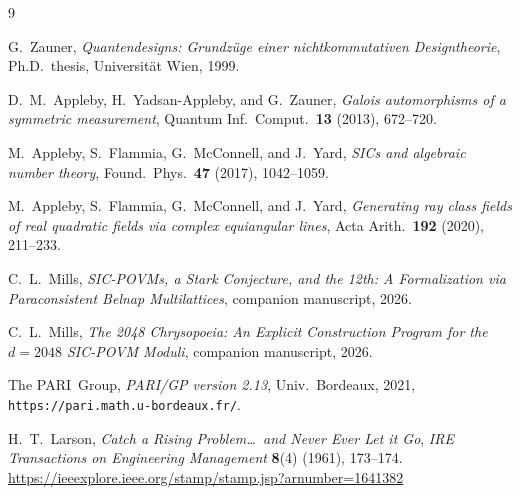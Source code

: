 \documentclass[12pt,a4paper]{article}
\begin{document}
\begin{thebibliography}{9}

G.\ Zauner, \emph{Quantendesigns: Grundz\"uge einer nichtkommutativen Designtheorie}, Ph.D.\ thesis, Universit\"at Wien, 1999.

D.\ M.\ Appleby, H.\ Yadsan-Appleby, and G.\ Zauner,
\emph{Galois automorphisms of a symmetric measurement},
Quantum Inf.\ Comput.\ \textbf{13} (2013), 672--720.

M.\ Appleby, S.\ Flammia, G.\ McConnell, and J.\ Yard,
\emph{SICs and algebraic number theory},
Found.\ Phys.\ \textbf{47} (2017), 1042--1059.

M.\ Appleby, S.\ Flammia, G.\ McConnell, and J.\ Yard,
\emph{Generating ray class fields of real quadratic fields via complex equiangular lines}, Acta Arith.\ \textbf{192} (2020), 211--233.

C.\ L.\ Mills, \emph{SIC-POVMs, a Stark Conjecture, and the 12th: A Formalization via Paraconsistent Belnap Multilattices}, companion manuscript, 2026.

C.\ L.\ Mills, \emph{The 2048 Chrysopoeia: An Explicit Construction Program for the $d=2048$ SIC-POVM Moduli}, companion manuscript, 2026.

The PARI~Group, \emph{PARI/GP version 2.13}, Univ.\ Bordeaux, 2021,
\texttt{https://pari.math.u-bordeaux.fr/}.

H.\ T.\ Larson,
\textit{Catch a Rising Problem\ldots\ and Never Ever Let it Go},
\emph{IRE Transactions on Engineering Management} \textbf{8}(4) (1961), 173--174.
\url{https://ieeexplore.ieee.org/stamp/stamp.jsp?arnumber=1641382}

\end{thebibliography}
\end{document}
